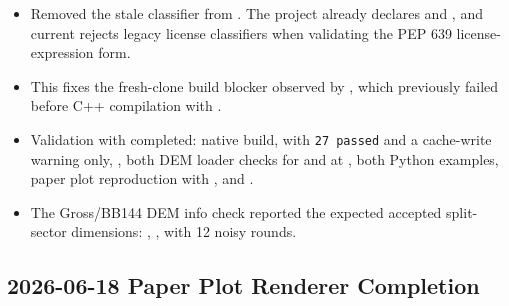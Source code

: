 \begin{itemize}
\item Removed the stale \texttt{} classifier from \texttt{}. The project already declares \texttt{} and \texttt{}, and current \texttt{} rejects legacy license classifiers when validating the PEP 639 license-expression form.
\item This fixes the fresh-clone build blocker observed by \texttt{}, which previously failed before C++ compilation with \texttt{}.
\item Validation with \texttt{} completed: native build, \texttt{} with \texttt{27 passed} and a cache-write warning only, \texttt{}, both DEM loader checks for \texttt{} and \texttt{} at \texttt{}, both Python examples, paper plot reproduction with \texttt{}, and \texttt{}.
\item The Gross/BB144 DEM info check reported the expected accepted split-sector dimensions: \texttt{}, \texttt{}, with 12 noisy rounds.
\end{itemize}

\subsection*{2026-06-18 Paper Plot Renderer Completion}

